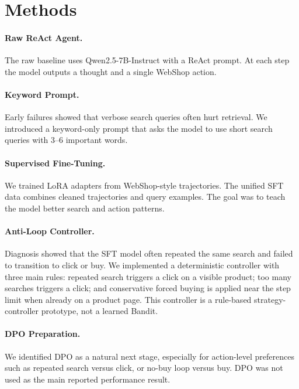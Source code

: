 \documentclass[11pt]{article}
\begin{document}
\section{Methods}
\paragraph{Raw ReAct Agent.}
The raw baseline uses Qwen2.5-7B-Instruct with a ReAct prompt. At each step the model outputs a thought and a single WebShop action.

\paragraph{Keyword Prompt.}
Early failures showed that verbose search queries often hurt retrieval. We introduced a keyword-only prompt that asks the model to use short search queries with 3--6 important words.

\paragraph{Supervised Fine-Tuning.}
We trained LoRA adapters from WebShop-style trajectories. The unified SFT data combines cleaned trajectories and query examples. The goal was to teach the model better search and action patterns.

\paragraph{Anti-Loop Controller.}
Diagnosis showed that the SFT model often repeated the same search and failed to transition to click or buy. We implemented a deterministic controller with three main rules: repeated search triggers a click on a visible product; too many searches triggers a click; and conservative forced buying is applied near the step limit when already on a product page. This controller is a rule-based strategy-controller prototype, not a learned Bandit.

\paragraph{DPO Preparation.}
We identified DPO as a natural next stage, especially for action-level preferences such as repeated search versus click, or no-buy loop versus buy. DPO was not used as the main reported performance result.
\end{document}
